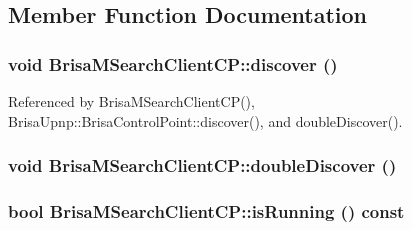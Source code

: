 \subsection{Member Function Documentation}
\hypertarget{classBrisaUpnp_1_1BrisaMSearchClientCP_ade684c9716da9485cfa2027be173a29c}{
\subsubsection[{discover}]{\setlength{\rightskip}{0pt plus 5cm}void BrisaMSearchClientCP::discover ()}}
\label{classBrisaUpnp_1_1BrisaMSearchClientCP_ade684c9716da9485cfa2027be173a29c}


Referenced by BrisaMSearchClientCP(), BrisaUpnp::BrisaControlPoint::discover(), and doubleDiscover().\hypertarget{classBrisaUpnp_1_1BrisaMSearchClientCP_acfed2d3bba45be386220e6260bdec322}{
\subsubsection[{doubleDiscover}]{\setlength{\rightskip}{0pt plus 5cm}void BrisaMSearchClientCP::doubleDiscover ()}}
\label{classBrisaUpnp_1_1BrisaMSearchClientCP_acfed2d3bba45be386220e6260bdec322}
\hypertarget{classBrisaUpnp_1_1BrisaMSearchClientCP_a2fe779dccea96c7df6acc5a82b4b79fd}{
\subsubsection[{isRunning}]{\setlength{\rightskip}{0pt plus 5cm}bool BrisaMSearchClientCP::isRunning () const}}
\label{classBrisaUpnp_1_1BrisaMSearchClientCP_a2fe779dccea96c7df6acc5a82b4b79fd}


